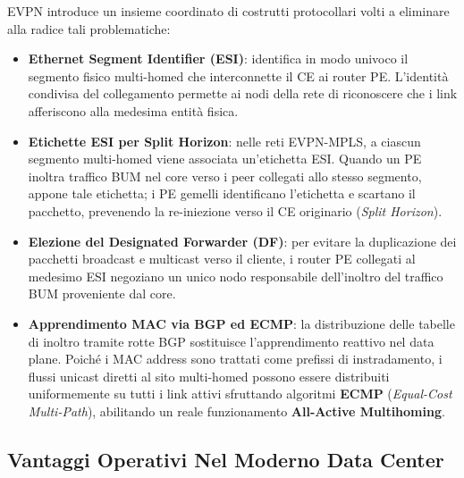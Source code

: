 \documentclass[11pt, a4paper]{article}
\begin{document}
EVPN introduce un insieme coordinato di costrutti protocollari volti a eliminare alla radice tali problematiche:
\begin{itemize}
    \item \textbf{Ethernet Segment Identifier (ESI)}: identifica in modo univoco il segmento fisico multi-homed che interconnette il CE ai router PE. L'identità condivisa del collegamento permette ai nodi della rete di riconoscere che i link afferiscono alla medesima entità fisica.
    \item \textbf{Etichette ESI per Split Horizon}: nelle reti EVPN-MPLS, a ciascun segmento multi-homed viene associata un'etichetta ESI. Quando un PE inoltra traffico BUM nel core verso i peer collegati allo stesso segmento, appone tale etichetta; i PE gemelli identificano l'etichetta e scartano il pacchetto, prevenendo la re-iniezione verso il CE originario (\emph{Split Horizon}).
    \item \textbf{Elezione del Designated Forwarder (DF)}: per evitare la duplicazione dei pacchetti broadcast e multicast verso il cliente, i router PE collegati al medesimo ESI negoziano un unico nodo responsabile dell'inoltro del traffico BUM proveniente dal core.
    \item \textbf{Apprendimento MAC via BGP ed ECMP}: la distribuzione delle tabelle di inoltro tramite rotte BGP sostituisce l'apprendimento reattivo nel data plane. Poiché i MAC address sono trattati come prefissi di instradamento, i flussi unicast diretti al sito multi-homed possono essere distribuiti uniformemente su tutti i link attivi sfruttando algoritmi \textbf{ECMP} (\emph{Equal-Cost Multi-Path}), abilitando un reale funzionamento \textbf{All-Active Multihoming}.
\end{itemize}

\subsection{Vantaggi Operativi Nel Moderno Data Center}
\end{document}
